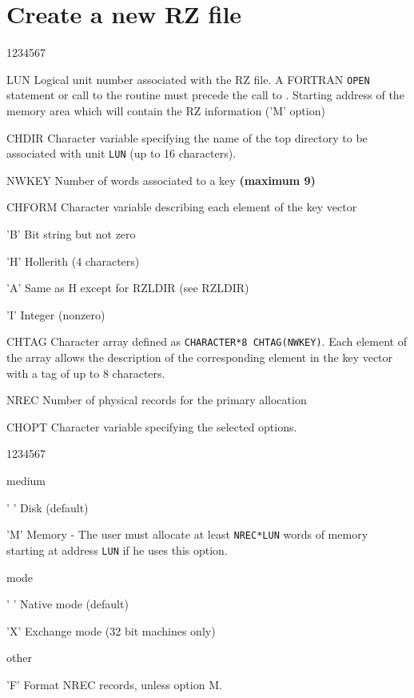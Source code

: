 \section{Create a new RZ file}
\Idesc
\begin{DLtt}{1234567}
\item[LUN]Logical unit number associated with the RZ file.
A FORTRAN {\tt OPEN} statement or call to the
routine  must precede the call to .
\newline Starting address of the memory area which will contain the
RZ information ('M' option)
\item[CHDIR]Character variable specifying the name of the top directory to be
associated with unit {\tt LUN} (up to 16 characters).
\item[NWKEY]Number of words associated to a key {\bf (maximum 9)}
\item[CHFORM]Character variable describing each element of the key vector
\begin{DLtt}{12}
\item['B']Bit string but not zero
\item['H']Hollerith (4 characters)
\item['A']Same as H except for RZLDIR (see RZLDIR)
\item['I']Integer (nonzero)
\end{DLtt}
\item[CHTAG]Character array defined as {\tt CHARACTER*8 CHTAG(NWKEY)}.
\newline
Each element of the array allows the description of the corresponding
element in the key vector with a tag of up to 8 characters.
\item[NREC]Number of physical records for the primary allocation
\item[CHOPT]Character variable specifying the selected options.
\begin{DLtt}{1234567}
\item[medium]
\begin{DLtt}{12}
\item[' ']Disk (default)
\item['M']Memory - The user must allocate at least {\tt NREC*LUN} words
of memory starting at address {\tt LUN} if he uses this option.
\end{DLtt}
\item[mode]
\begin{DLtt}{12}
\item[' ']Native mode (default)
\item['X']Exchange mode (32 bit machines only)
\end{DLtt}
\item[other]
\begin{DLtt}{12}
\item['F']Format NREC records, unless option M.
\end{DLtt}
\end{DLtt}
\end{DLtt}
